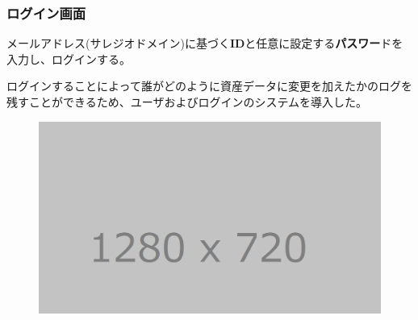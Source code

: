 \documentclass[11ptm]{jsarticle}
\begin{document}
\subsubsection{ログイン画面}
\label{sec:ログイン画面}
メールアドレス(サレジオドメイン)に基づく{\bf ID}と任意に設定する{\bf パスワー}ドを入力し、ログインする。\par
ログインすることによって誰がどのように資産データに変更を加えたかのログを残すことができるため、ユーザおよびログインのシステムを導入した。
\begin{figure}[h]
  \centering
  \includegraphics[keepaspectratio, width=0.8\linewidth]{source/tmp_picture.png}
  \caption{\label{fig:}}
\end{figure}

\clearpage
\end{document}
